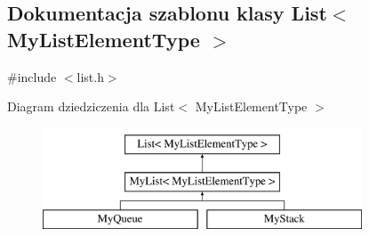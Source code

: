 \hypertarget{class_list}{\subsection{Dokumentacja szablonu klasy List$<$ My\-List\-Element\-Type $>$}
\label{class_list}
}


{\ttfamily \#include $<$list.\-h$>$}

Diagram dziedziczenia dla List$<$ My\-List\-Element\-Type $>$\begin{figure}[H]
\begin{center}
\leavevmode
\includegraphics[height=3.000000cm]{class_list}
\end{center}
\end{figure}
